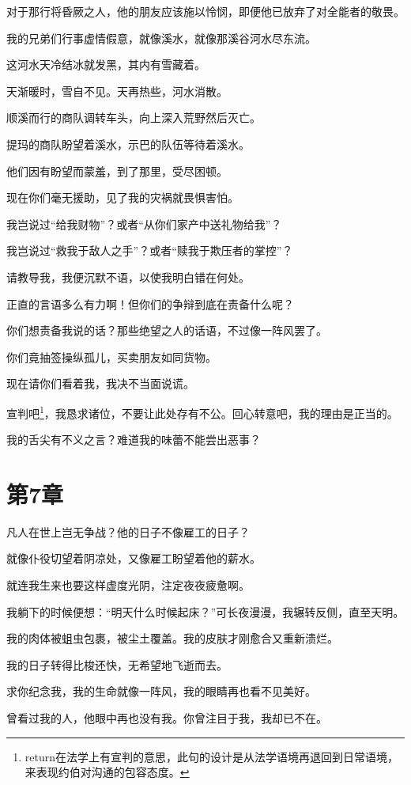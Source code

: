 \documentclass[12pt,oneside]{book}
\begin{document}
对于那行将昏厥之人，他的朋友应该施以怜悯，即便他已放弃了对全能者的敬畏。

我的兄弟们行事虚情假意，就像溪水，就像那溪谷河水尽东流。

这河水天冷结冰就发黑，其内有雪藏着。

天渐暖时，雪自不见。天再热些，河水消散。

顺溪而行的商队调转车头，向上深入荒野然后灭亡。

提玛的商队盼望着溪水，示巴的队伍等待着溪水。

他们因有盼望而蒙羞，到了那里，受尽困顿。

现在你们毫无援助，见了我的灾祸就畏惧害怕。

我岂说过“给我财物”？或者“从你们家产中送礼物给我”？

我岂说过“救我于敌人之手”？或者“赎我于欺压者的掌控”？

请教导我，我便沉默不语，以使我明白错在何处。

正直的言语多么有力啊！但你们的争辩到底在责备什么呢？

你们想责备我说的话？那些绝望之人的话语，不过像一阵风罢了。

你们竟抽签操纵孤儿，买卖朋友如同货物。

现在请你们看着我，我决不当面说谎。

宣判吧\footnote{return在法学上有宣判的意思，此句的设计是从法学语境再退回到日常语境，来表现约伯对沟通的包容态度。}，我恳求诸位，不要让此处存有不公。回心转意吧，我的理由是正当的。

我的舌尖有不义之言？难道我的味蕾不能尝出恶事？



\chapter{第7章}
凡人在世上岂无争战？他的日子不像雇工的日子？

就像仆役切望着阴凉处，又像雇工盼望着他的薪水。

就连我生来也要这样虚度光阴，注定夜夜疲惫啊。

我躺下的时候便想：“明天什么时候起床？”可长夜漫漫，我辗转反侧，直至天明。

我的肉体被蛆虫包裹，被尘土覆盖。我的皮肤才刚愈合又重新溃烂。

我的日子转得比梭还快，无希望地飞逝而去。

求你纪念我，我的生命就像一阵风，我的眼睛再也看不见美好。

曾看过我的人，他眼中再也没有我。你曾注目于我，我却已不在。
\end{document}
